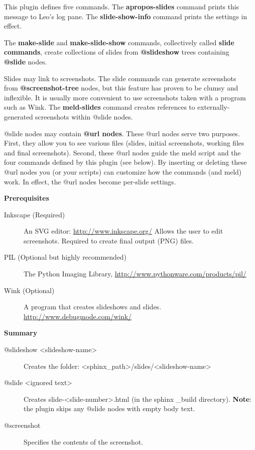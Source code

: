 \documentclass[a4paper,10pt,english]{sphinxmanual}
\begin{document}
This plugin defines five commands. The
\textbf{apropos-slides} command prints this message to
Leo's log pane. The \textbf{slide-show-info} command
prints the settings in effect.

The \textbf{make-slide} and \textbf{make-slide-show}
commands, collectively called \textbf{slide commands},
create collections of slides from \textbf{@slideshow}
trees containing \textbf{@slide} nodes.

Slides may link to screenshots. The slide commands
can generate screenshots from \textbf{@screenshot-tree}
nodes, but this feature has proven to be clumsy
and inflexible. It is usually more convenient to
use screenshots taken with a program such as Wink.
The \textbf{meld-slides} command creates references to
externally-generated screenshots within @slide
nodes.

@slide nodes may contain \textbf{@url nodes}. These @url
nodes serve two purposes. First, they allow you to
see various files (slides, initial screenshots,
working files and final screenshots). Second,
these @url nodes guide the meld script and the
four commands defined by this plugin (see below).
By inserting or deleting these @url nodes you (or
your scripts) can customize how the commands (and
meld) work. In effect, the @url nodes become
per-slide settings.

\textbf{Prerequisites}
\begin{description}
\item[{Inkscape (Required)}] \leavevmode
An SVG editor: \href{http://www.inkscape.org/}{http://www.inkscape.org/}
Allows the user to edit screenshots.
Required to create final output (PNG) files.

\item[{PIL (Optional but highly recommended)}] \leavevmode
The Python Imaging Library,
\href{http://www.pythonware.com/products/pil/}{http://www.pythonware.com/products/pil/}

\item[{Wink (Optional)}] \leavevmode
A program that creates slideshows and slides.
\href{http://www.debugmode.com/wink/}{http://www.debugmode.com/wink/}

\end{description}

\textbf{Summary}
\begin{description}
\item[{@slideshow \textless{}slideshow-name\textgreater{}}] \leavevmode
Creates the folder:
\textless{}sphinx\_path\textgreater{}/slides/\textless{}slideshow-name\textgreater{}

\item[{@slide \textless{}ignored text\textgreater{}}] \leavevmode
Creates slide-\textless{}slide-number\textgreater{}.html
(in the sphinx \_build directory).
\textbf{Note}: the plugin skips any @slide nodes
with empty body text.

\item[{@screenshot}] \leavevmode
Specifies the contents of the screenshot.

\end{description}
\end{document}
